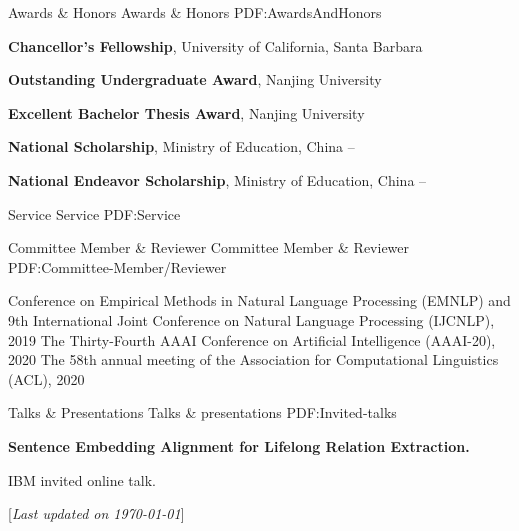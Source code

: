 \documentclass[letterpaper,MMMyyyy,nonstopmode]{simpleresumecv}
\newcommand{\CVNote}{Last updated on {\today}}
\begin{document}
\begin{Body}
\begin{enumerate}[label={[\arabic*]~~}]
\end{enumerate}



\Section
{Awards \&\newline
Honors}
{Awards \& Honors}
{PDF:AwardsAndHonors}

\Entry
\textbf{Chancellor's Fellowship}, University of California, Santa Barbara
\hfill
{}

\Gap
\Entry
\textbf{Outstanding Undergraduate Award}, Nanjing University
\hfill
{}

\Gap
\Entry
\textbf{Excellent Bachelor Thesis Award}, Nanjing University
\hfill
{}

\Gap
\Entry
\textbf{National Scholarship}, Ministry of Education, China
\hfill
{} -- 

\Gap
\Entry
\textbf{National Endeavor Scholarship}, Ministry of Education, China
\hfill
{} -- 

\Section
{Service}
{Service}
{PDF:Service}

\SubSection
{Committee Member \& Reviewer}
{Committee Member \& Reviewer}
{PDF:Committee-Member/Reviewer}

    \BulletItem Conference on Empirical Methods in Natural Language Processing (EMNLP) and 9th International Joint Conference on Natural Language Processing (IJCNLP), 2019
    \BulletItem The Thirty-Fourth AAAI Conference on Artificial Intelligence (AAAI-20), 2020
    \BulletItem The 58th annual meeting of the Association for Computational Linguistics (ACL), 2020

\Section
{Talks \& \newline Presentations}
{Talks \& presentations}
{PDF:Invited-talks}

\Entry \textbf{Sentence Embedding Alignment for Lifelong Relation Extraction.} \hfill {}
\begin{Detail}
\BulletItem
IBM invited online talk.
\end{Detail}


\end{Body}


\UseNoteFont%
\null\hfill%
[\textit{\CVNote}]
\end{document}
